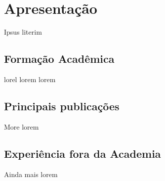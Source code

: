 \chapter{Apresentação}
Ipsus literim

\section*{Formação Acadêmica}
lorel lorem lorem

\section*{Principais publicações}
More lorem

\section*{Experiência fora da Academia}\label{expfora}
Ainda mais lorem





